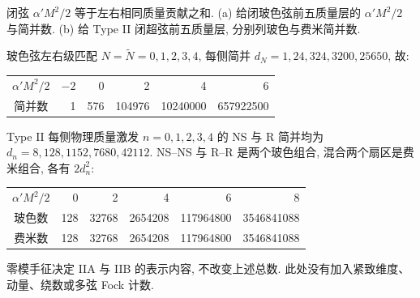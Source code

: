 \begin{exercise}
闭弦 $\alpha'M^2/2$ 等于左右相同质量贡献之和.
(a) 给闭玻色弦前五质量层的 $\alpha'M^2/2$ 与简并数.
(b) 给 Type II 闭超弦前五质量层, 分别列玻色与费米简并数.
\end{exercise}
\begin{solution}
玻色弦左右级匹配 $N=\tilde N=0,1,2,3,4$, 每侧简并 $d_N=1,24,324,3200,25650$, 故:
\begin{center}\begin{tabular}{c|rrrrr}
$\alpha'M^2/2$&$-2$&0&2&4&6\\
简并数&1&576&104976&10240000&657922500
\end{tabular}\end{center}
Type II 每侧物理质量激发 $n=0,1,2,3,4$ 的 NS 与 R 简并均为 $d_n=8,128,1152,7680,42112$. NS--NS 与 R--R 是两个玻色组合, 混合两个扇区是费米组合, 各有 $2d_n^2$:
\begin{center}\begin{tabular}{c|rrrrr}
$\alpha'M^2/2$&0&2&4&6&8\\
玻色数&128&32768&2654208&117964800&3546841088\\
费米数&128&32768&2654208&117964800&3546841088
\end{tabular}\end{center}
零模手征决定 IIA 与 IIB 的表示内容, 不改变上述总数. 此处没有加入紧致维度、动量、绕数或多弦 Fock 计数.
\end{solution}
